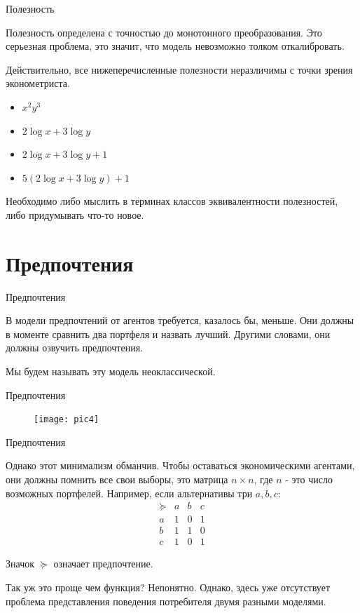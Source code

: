 \documentclass{beamer}
\begin{document}
\begin{frame}{Полезность}

Полезность определена с точностью до монотонного преобразования. Это серьезная проблема, это значит, что модель невозможно толком \alert{откалибровать}.

Действительно, все нижеперечисленные полезности неразличимы с точки зрения эконометриста. 
\begin{itemize}
\item $x^2 y^3$
\item $2 \log x + 3 \log y$
\item $2 \log x + 3 \log y + 1$
\item $5(2 \log x + 3 \log y) + 1$
\end{itemize}

Необходимо либо мыслить в терминах классов эквивалентности полезностей, либо придумывать что-то новое.

\end{frame}

\section{Предпочтения}

\begin{frame}{Предпочтения}

В модели предпочтений от агентов требуется, казалось бы, меньше. Они должны в моменте сравнить два портфеля и назвать лучший. Другими словами, они должны озвучить предпочтения.

Мы будем называть эту модель \alert{неоклассической}.

\end{frame}

\begin{frame}{Предпочтения}

\begin{figure}[hbt]
\centering
\texttt{[image: pic4]}
\end{figure}

\end{frame}

\begin{frame}{Предпочтения}

Однако этот минимализм обманчив. Чтобы оставаться экономическими агентами, они должны помнить все свои выборы, это матрица $n \times n$, где $n$ - это число возможных портфелей. Например, если альтернативы три $a,b,c$:
$$\begin{array}{c|ccc}
 \succcurlyeq & a & b & c\\
 \hline
 a & 1 & 0 & 1\\
 b & 1 & 1 & 0\\
 c & 1 & 0 & 1
\end{array}$$

Значок $\succcurlyeq$ означает предпочтение.

Так уж это проще чем функция? Непонятно. Однако, здесь уже отсутствует проблема представления поведения потребителя двумя разными моделями.

\end{frame}
\end{document}
